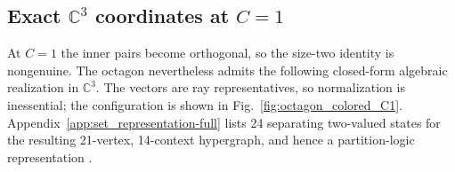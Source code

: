 \documentclass[
  twocolumn,
  aps,
  pra,
  floatfix,
  amsmath,amssymb,
  longbibliography
]{revtex4-2}
\theoremstyle{definition}
\theoremstyle{remark}
\begin{document}
\subsection{Exact \texorpdfstring{$\mathbb C^3$}{C3} coordinates at \texorpdfstring{$C=1$}{C=1}}
\label{app:C1}

At \(C=1\) the inner pairs become orthogonal, so the size-two identity
is nongenuine.  The octagon nevertheless admits the following closed-form
algebraic realization in \(\mathbb C^3\).  The vectors are ray
representatives, so normalization is inessential; the configuration is
shown in Fig.~\ref{fig:octagon_colored_C1}.  Appendix~\ref{app:set_representation-full}
lists 24 separating two-valued states for the resulting 21-vertex,
14-context hypergraph, and hence a partition-logic representation
\cite{ZirlSchl-65,greechie-66-PhD,kochen1}.



\newcommand{\twodot}[3]{%
  \node[circle, fill=#1, draw=#1, minimum size=7.2pt, inner sep=0pt] at #3 {};
  \node[circle, fill=#2, draw=#2, minimum size=4.2pt, inner sep=0pt] at #3 {};
}

\newcommand{\twodotlabel}[5]{%
  \node[circle, fill=#1, draw=#1, minimum size=7.2pt, inner sep=0pt,
        label={[font=\scriptsize, label distance=0.7mm]#3:{#4}}] at #5 {};
  \node[circle, fill=#2, draw=#2, minimum size=4.2pt, inner sep=0pt] at #5 {};
}
\end{document}
